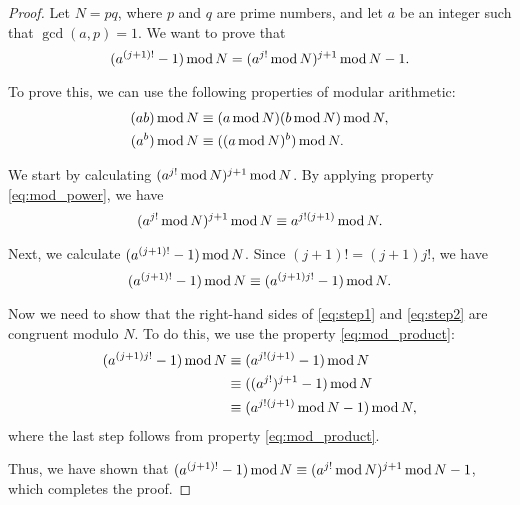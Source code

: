 \documentclass[12pt,openany]{book}
\theoremstyle{definition}
\renewcommand{\mod}{\operatorname{\textnormal{mod}}}
\begin{document}
	\begin{proof}
		Let $N = pq$, where $p$ and $q$ are prime numbers, and let $a$ be an integer such that $\gcd(a, p) = 1$. We want to prove that
		\begin{equation} \label{eq:congruence}
		(a^{(j+1)!} - 1) \mod N = (a^{j!} \mod N)^{j+1} \mod N - 1.
		\end{equation}
		
		To prove this, we can use the following properties of modular arithmetic:
		\begin{align}
		(ab) \mod N &\equiv (a \mod N)(b \mod N) \mod N, \label{eq:mod_product} \\
		(a^b) \mod N &\equiv ((a \mod N)^b) \mod N. \label{eq:mod_power}
		\end{align}
		
		We start by calculating $(a^{j!} \mod N)^{j+1} \mod N$. By applying property \eqref{eq:mod_power}, we have
		\begin{equation} \label{eq:step1}
		(a^{j!} \mod N)^{j+1} \mod N \equiv a^{j!(j+1)} \mod N.
		\end{equation}
		
		Next, we calculate $(a^{(j+1)!} - 1) \mod N$. Since $(j+1)! = (j+1)j!$, we have
		\begin{equation} \label{eq:step2}
		(a^{(j+1)!} - 1) \mod N \equiv (a^{(j+1)j!} - 1) \mod N.
		\end{equation}
		
		Now we need to show that the right-hand sides of \eqref{eq:step1} and \eqref{eq:step2} are congruent modulo $N$. To do this, we use the property \eqref{eq:mod_product}:
		\begin{align*}
		(a^{(j+1)j!} - 1) \mod N &\equiv (a^{j!(j+1)} - 1) \mod N \\
		&\equiv ((a^{j!})^{j+1} - 1) \mod N \\
		&\equiv (a^{j!(j+1)} \mod N - 1) \mod N,
		\end{align*}
		where the last step follows from property \eqref{eq:mod_product}.
		
		Thus, we have shown that $(a^{(j+1)!} - 1) \mod N \equiv (a^{j!} \mod N)^{j+1} \mod N - 1$, which completes the proof.
	\end{proof}
	
\end{document}
